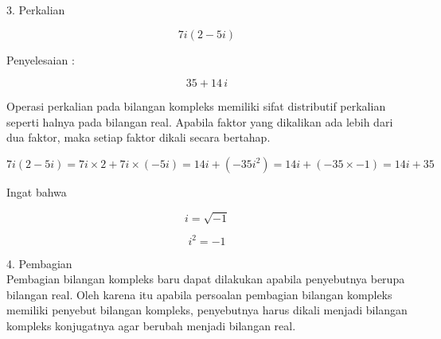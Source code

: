 \documentclass{article}
\begin{document}
\begin{eulernotebook}
\begin{eulercomment}
\begin{eulercomment}
\begin{eulercomment}
\begin{eulercomment}
\begin{eulercomment}
\begin{eulercomment}
\begin{eulercomment}
\begin{eulercomment}
\begin{eulercomment}
\begin{eulercomment}
\begin{eulercomment}
3. Perkalian\\
\end{eulercomment}
\begin{eulerformula}
\[
7i(2-5i)
\]
\end{eulerformula}
\begin{eulercomment}
Penyelesaian :
\end{eulercomment}
\begin{eulerformula}
\[
35+14\,i
\]
\end{eulerformula}
\begin{eulercomment}
Operasi perkalian pada bilangan kompleks memiliki sifat distributif
perkalian seperti halnya pada bilangan real. Apabila faktor yang
dikalikan ada lebih dari dua faktor, maka setiap faktor dikali secara
bertahap.\\
\end{eulercomment}
\begin{eulerformula}
\[
7i(2-5i)=7i\times 2 + 7i\times ({-5i})= 14i+({-35i^2})= 14i + ({-35} \times {-1}) = 14i + 35
\]
\end{eulerformula}
\begin{eulercomment}
Ingat bahwa\\
\end{eulercomment}
\begin{eulerformula}
\[
i = \sqrt{-1}
\]
\end{eulerformula}
\begin{eulerformula}
\[
i^2 = {-1}
\]
\end{eulerformula}
\begin{eulercomment}
4. Pembagian\\
Pembagian bilangan kompleks baru dapat dilakukan apabila penyebutnya
berupa bilangan real. Oleh karena itu apabila persoalan pembagian
bilangan kompleks memiliki penyebut bilangan kompleks, penyebutnya
harus dikali menjadi bilangan kompleks konjugatnya agar berubah
menjadi bilangan real.


\end{eulercomment}
\end{eulercomment}
\end{eulercomment}
\end{eulercomment}
\end{eulercomment}
\end{eulercomment}
\end{eulercomment}
\end{eulercomment}
\end{eulercomment}
\end{eulercomment}
\end{eulercomment}
\end{eulernotebook}
\end{document}

